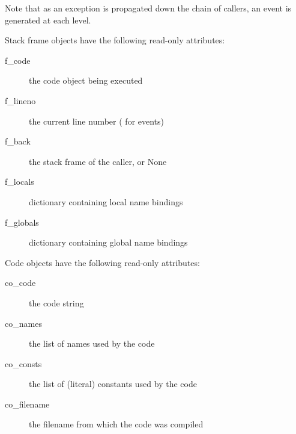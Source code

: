 Note that as an exception is propagated down the chain of callers, an
 event is generated at each level.

Stack frame objects have the following read-only attributes:

\begin{description}
\item[f_code]      the code object being executed
\item[f_lineno]    the current line number ( for  events)
\item[f_back]      the stack frame of the caller, or None
\item[f_locals]    dictionary containing local name bindings
\item[f_globals]   dictionary containing global name bindings
\end{description}

Code objects have the following read-only attributes:

\begin{description}
\item[co_code]     the code string
\item[co_names]    the list of names used by the code
\item[co_consts]   the list of (literal) constants used by the code
\item[co_filename] the filename from which the code was compiled
\end{description}
